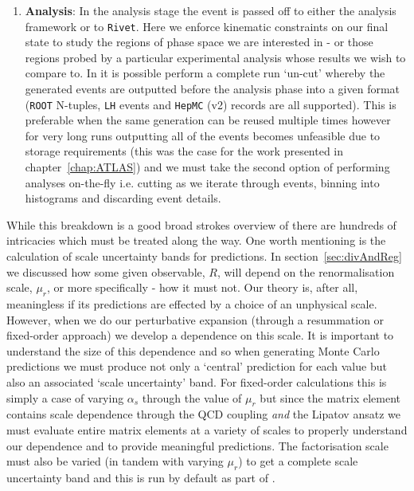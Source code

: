 \begin{enumerate}
			\item \textbf{Analysis}: In the analysis stage the event is passed off to either
			the \HEJ analysis framework or to \texttt{Rivet}.
			Here we enforce kinematic constraints on our final state to study the regions of
			phase space we are interested in - or those regions probed by a particular
			experimental analysis whose results we wish to compare to.  In \HEJ it is possible
			perform a complete run `un-cut' whereby the generated events are outputted before
			the analysis phase into a given format (\texttt{ROOT} N-tuples, \texttt{LH} events
			and \texttt{HepMC} (v2) records are all supported).  This is preferable when the same
			generation can be reused multiple times however for very long runs outputting all of the
			events becomes unfeasible due to storage requirements (this was the case for the work
			presented in chapter~\ref{chap:ATLAS}) and we must take the second option of performing
			\HEJ analyses on-the-fly i.e. cutting as we iterate through events, binning into
			histograms and discarding event details.
		\end{enumerate}

		While this breakdown is a good broad strokes overview of \HEJ there are hundreds of intricacies
		which must be treated along the way.  One worth mentioning is the calculation of scale uncertainty
		bands for predictions.  In section~\eqref{sec:divAndReg} we discussed how some given observable, $R$,
		will depend on the renormalisation scale, $\mu_r$, or more specifically - how it must not.  Our theory
		is, after all, meaningless if its predictions are effected by a choice of an unphysical scale.  However,
		when we do our perturbative expansion (through a resummation or fixed-order approach) we develop a
		dependence on this scale.  It is important to understand the size of this dependence and so when
		generating Monte Carlo predictions we must produce not only a `central' prediction for each value but
		also an associated `scale uncertainty' band.  For fixed-order calculations this is simply a case of
		varying $\alpha_s$ through the value of $\mu_r$ but since the \hej matrix element contains scale
		dependence through the QCD coupling \emph{and} the Lipatov ansatz we must evaluate entire matrix elements
		at a variety of scales to properly understand our dependence and to provide meaningful predictions.  The
		factorisation scale must also be varied (in tandem with varying $\mu_r$) to get a complete
		scale uncertainty band and this is run by default as part of \HEJ.

